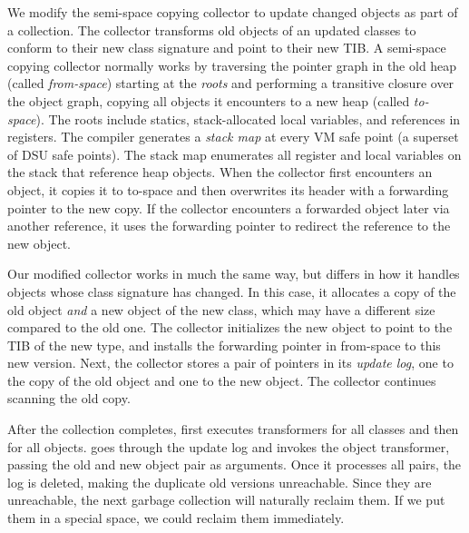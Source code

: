 We modify the \JikesRVM{}
semi-space copying collector \cite{BCM:04} to 
update changed objects as part of a collection. 
The collector transforms old objects of an updated classes to conform
to their new class signature and point to their new TIB.
A semi-space copying collector normally works by traversing the
pointer graph in the old heap (called \emph{from-space}) starting at
the \emph{roots} and performing a transitive closure over the object
graph, copying all objects it encounters to a new heap (called
\emph{to-space}).  The roots include statics, stack-allocated local variables, and references in registers.  The compiler generates a
\emph{stack map} at every VM safe point (a superset of DSU safe
points).  The stack map enumerates all register and local variables on
the stack that reference heap objects.  When the collector first
encounters an object, it copies it to to-space and then overwrites
its header with a forwarding pointer to the new copy.  If the
collector encounters a forwarded object later via another reference,
it uses the forwarding pointer to redirect the reference to the new
object.

Our modified collector works in much the same way, but differs in how
it handles objects whose class signature has changed.  In this case,
it allocates a copy of the old object \emph{and} a new object of the new
class, which may have a different size compared to the old one. The collector
initializes the new object to point to the TIB of the new type, and
installs the forwarding pointer in from-space to this new version. Next,
the collector stores a pair of pointers in its \emph{update log}, one
to the copy of the old object and one to the 
new object.  The collector continues scanning the old copy.

After the collection completes, \DSU{} first executes transformers for all
classes and then for all objects. 
\DSU{} goes
through the update log and invokes the object transformer, passing
the old and new object pair as arguments.  Once it processes all
pairs, the log is deleted, making the  duplicate
old versions unreachable.  
Since they are unreachable, the next garbage collection will naturally
reclaim them.  If we put them in a special space, we could reclaim
them immediately.%

